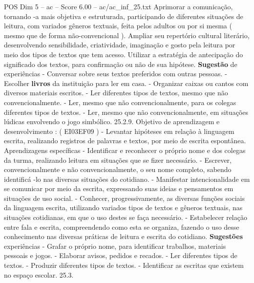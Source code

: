 \begin{textsample}{POS Dim 5 – ac – Score 6.00 – ac/ac\_inf\_25.txt}
Aprimorar a comunicação, tornando -a mais objetiva e estruturada, participando de diferentes situações de leitura, com variados gêneros textuais, feita pelos adultos ou por si mesma ( mesmo que de forma não-convencional ).
Ampliar seu repertório cultural literário, desenvolvendo sensibilidade, criatividade, imaginação e gosto pela leitura por meio dos tipos de textos que tem acesso.
Utilizar a estratégia de antecipação do significado dos textos, para confirmação ou não de sua hipótese. \textbf{Sugestão} de experiências - Conversar sobre seus textos preferidos com outras pessoas. - Escolher \textbf{livros} da instituição para ler em casa. - Organizar caixas ou cantos com diversos materiais escritos. - Ler diferentes tipos de textos, mesmo que não convencionalmente. - Ler, mesmo que não convencionalmente, para os colegas diferentes tipos de textos. - Ler, mesmo que não convencionalmente, em situações lúdicas envolvendo o jogo simbólico. 25.2.9.
Objetivo de aprendizagem e desenvolvimento : ( EI03EF09 ) - Levantar hipóteses em relação à linguagem escrita, realizando registros de palavras e textos, por meio de escrita espontânea.
Aprendizagens específicas - Identificar e reconhecer o próprio nome e dos colegas da turma, realizando leitura em situações que se fizer necessário. - Escrever, convencionalmente e não convencionalmente, o seu nome completo, sabendo identificá -lo nas diversas situações do cotidiano. - Manifestar intencionalidade em se comunicar por meio da escrita, expressando suas ideias e pensamentos em situações de uso social. - Conhecer, progressivamente, as diversas funções sociais da linguagem escrita, utilizando variados tipos de textos e gêneros textuais, nas situações cotidianas, em que o uso destes se faça necessário. - Estabelecer relação entre fala e escrita, compreendendo como esta se organiza, fazendo o uso desse conhecimento nas diversas práticas de leitura e escrita do cotidiano. \textbf{Sugestões} experiências - Grafar o próprio nome, para identificar trabalhos, materiais pessoais e jogos. - Elaborar avisos, pedidos e recados. - Ler diferentes tipos de textos. - Produzir diferentes tipos de textos. - Identificar as escritas que existem no espaço escolar. 25.3.

\end{textsample}
